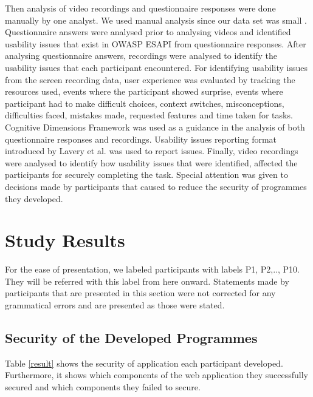 \documentclass[10pt]{article}
\begin{document}
Then analysis of video recordings and questionnaire responses were done manually by one analyst. We used manual analysis since our data set was small \cite{manual}. Questionnaire answers were analysed prior to analysing videos and identified usability issues that exist in OWASP ESAPI from questionnaire responses. After analysing questionnaire answers, recordings were analysed to identify the usability issues that each participant encountered. For identifying usability issues from the screen recording data, user experience was evaluated by tracking the resources used, events where the participant showed surprise, events where participant had to make difficult choices, context switches, misconceptions, difficulties faced, mistakes made, requested features and time taken for tasks. Cognitive Dimensions Framework \cite{wijaya} was used as a guidance in the analysis of both questionnaire responses and recordings. Usability issues reporting format introduced by Lavery et al. \cite{lavery1997comparison} was used to report issues. Finally, video recordings were analysed to identify how usability issues that were identified, affected the participants for securely completing the task. Special attention was given to decisions made by participants that caused to reduce the security of programmes they developed.

\section{Study Results}

For the ease of presentation, we labeled participants with labels P1, P2,.., P10. They will be referred with this label from here onward. Statements made by participants that are presented in this section were not corrected for any grammatical errors and are presented as those were stated.

\subsection{Security of the Developed Programmes}

Table \ref{result} shows the security of application each participant developed. Furthermore, it shows which components of the web application they successfully secured and which components they failed to secure.
\end{document}
